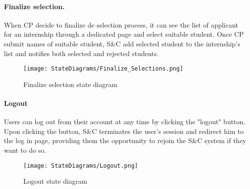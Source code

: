 \paragraph{Finalize selection.}
When CP decide to finalize de selection process, it can see the list of applicant for an internship through a dedicated page and select suitable student.
Once CP submit names of suitable student, S\&C add selected student to the internship's list and notifies both selected and rejected students.

\begin{figure}[H]
    \begin{center}
        \texttt{[image: StateDiagrams/Finalize\_Selections.png]}
        \caption{Finalize selection state diagram}
        \label{fig:finalize_selections_sd}%
    \end{center}
\end{figure}

\paragraph{Logout}
Users can log out from their account at any time by clicking the "logout" button. Upon clicking the button, S\&C terminates the user's session and redirect him to the log in page, providing them the opportunity to rejoin the S\&C system if they want to do so.

\begin{figure}[H]
    \begin{center}
        \texttt{[image: StateDiagrams/Logout.png]}
        \caption{Logout state diagram}
        \label{fig:logout_sd}%
    \end{center}
\end{figure}

